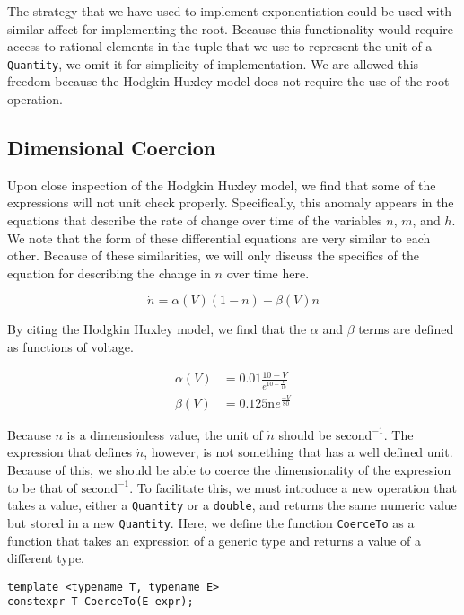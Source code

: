 \documentclass[reprint]{revtex4-1}
\begin{document}
The strategy that we have used to implement exponentiation could be used with similar affect for implementing
the root. Because this functionality would require access to rational elements in the tuple that we use to represent
the unit of a \verb|Quantity|, we omit it for simplicity of implementation. We are allowed this freedom because
the Hodgkin Huxley model does not require the use of the root operation.

\subsection{Dimensional Coercion}

Upon close inspection of the Hodgkin Huxley model, we find that some of the expressions will not unit check
properly. Specifically, this anomaly appears in the equations that describe the rate of change over time of the
variables $n$, $m$, and $h$. We note that the form of these differential equations are very similar to each other.
Because of these similarities, we will only discuss the specifics of the equation for describing
the change in $n$ over time here.

\begin{equation*}
  \dot{n} = \alpha\left(V\right) \left(1 - n \right) - \beta\left(V\right)n
\end{equation*}

By citing the Hodgkin Huxley model, we find that the $\alpha$ and $\beta$ terms are defined as functions of voltage.

\begin{align*}
  \alpha\left(V\right) & = 0.01\frac{10 - V}{e^{10-\frac{V}{10}}} \\
  \beta\left(V\right) & = 0.125 \text{n} e^{\frac{-V}{80}}
\end{align*}

Because $n$ is a dimensionless value, the unit of $\dot{n}$ should be $\text{second}^{-1}$. The expression
that defines $\dot{n}$, however, is not something that has a well defined unit. Because of this, we should
be able to coerce the dimensionality of the expression to be that of $\text{second}^{-1}$. To facilitate
this, we must introduce a new operation that takes a value, either a \verb|Quantity| or a \verb|double|,
and returns the same numeric value but stored in a new \verb|Quantity|. Here, we define the function
\verb|CoerceTo| as a function that takes an expression of a generic type and returns a value of a different type.
\begin{verbatim}
template <typename T, typename E>
constexpr T CoerceTo(E expr);
\end{verbatim}
\end{document}
